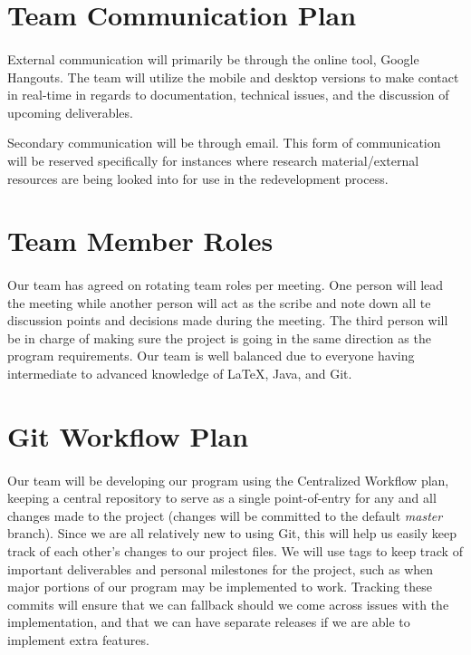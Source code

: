 \documentclass{article}
\begin{document}
\section{Team Communication Plan}

\paragraph{}
External communication will primarily be through the online tool, Google Hangouts. The team will utilize the mobile and desktop versions to make contact in real-time in regards to documentation, technical issues, and the discussion of upcoming deliverables.\par Secondary communication will be through email. This form of communication will be reserved specifically for instances where research material/external resources are being looked into for use in the redevelopment process.

\section{Team Member Roles}

\paragraph{}
Our team has agreed on rotating team roles per meeting. One person will lead the meeting while another person will act as the scribe and note down all te discussion points and decisions made during the meeting. The third person will be in charge of making sure the project is going in the same direction as the program requirements. Our team is well balanced due to everyone having intermediate to advanced knowledge of LaTeX, Java, and Git.

\section{Git Workflow Plan}

\paragraph{}
Our team will be developing our program using the Centralized Workflow plan, keeping a central repository to serve as a single point-of-entry for any and all changes made to the project (changes will be committed to the default \textit{master} branch). Since we are all relatively new to using Git, this will help us easily keep track of each other's changes to our project files. We will use tags to keep track of important deliverables and personal milestones for the project, such as when major portions of our program may be implemented to work. Tracking these commits will ensure that we can fallback should we come across issues with the implementation, and that we can have separate releases if we are able to implement extra features.
\end{document}
